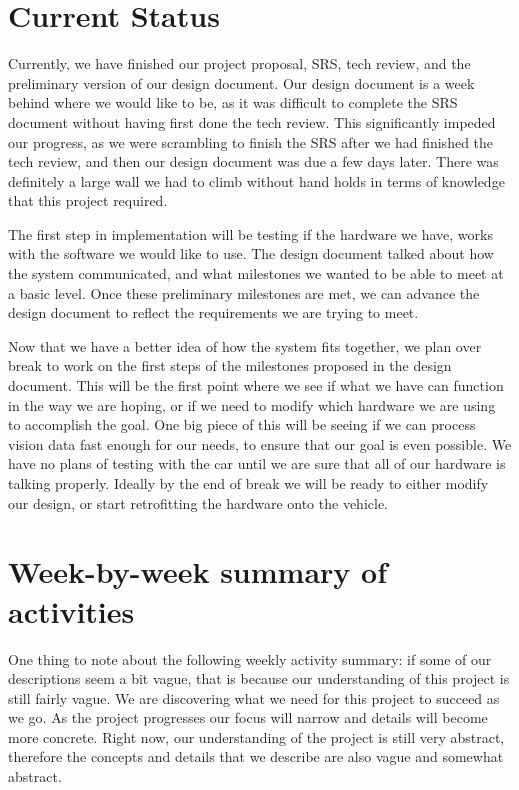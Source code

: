 \documentclass[compsoc,draftclsnofoot,onecolumn,10pt]{IEEEtran}
\begin{document}
\section{Current Status}
Currently, we have finished our project proposal, SRS, tech review, and the preliminary version of our design document. 
Our design document is a week behind where we would like to be, as it was difficult to complete the SRS document without having first done the tech review. 
This significantly impeded our progress, as we were scrambling to finish the SRS after we had finished the tech review, and then our design document was due a few days later.
There was definitely a large wall we had to climb without hand holds in terms of knowledge that this project required.\par

The first step in implementation will be testing if the hardware we have, works with the software we would like to use. 
The design document talked about how the system communicated, and what milestones we wanted to be able to meet at a basic level. 
Once these preliminary milestones are met, we can advance the design document to reflect the requirements we are trying to meet. \par

Now that we have a better idea of how the system fits together, we plan over break to work on the first steps of the milestones proposed in the design document. 
This will be the first point where we see if what we have can function in the way we are hoping, or if we need to modify which hardware we are using to accomplish the goal.
One big piece of this will be seeing if we can process vision data fast enough for our needs, to ensure that our goal is even possible. 
We have no plans of testing with the car until we are sure that all of our hardware is talking properly. 
Ideally by the end of break we will be ready to either modify our design, or start retrofitting the hardware onto the vehicle.

\section{Week-by-week summary of activities}

One thing to note about the following weekly activity summary: if some of our
descriptions seem a bit vague, that is because our understanding of this project
is still fairly vague. We are discovering what we need for this project to
succeed as we go. As the project progresses our focus will narrow and details
will become more concrete. Right now, our understanding of the project is still very
abstract, therefore the concepts and details that we describe are also vague and
somewhat abstract.
\end{document}
